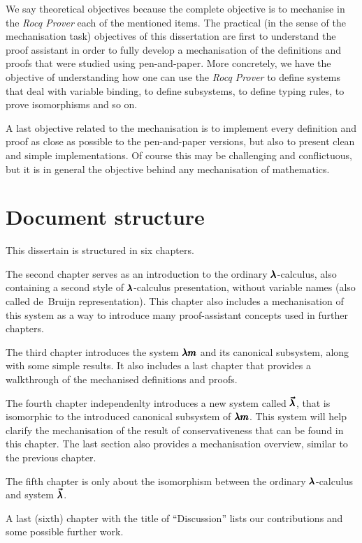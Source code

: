 We say theoretical objectives because the complete objective is to mechanise in the \textit{Rocq Prover} each of the mentioned items.
The practical (in the sense of the mechanisation task) objectives of this dissertation are first to understand the proof assistant in order to fully develop a mechanisation of the definitions and proofs that were studied using pen-and-paper.
More concretely, we have the objective of understanding how one can use the \textit{Rocq Prover} to define systems that deal with variable binding, to define subsystems, to define typing rules, to prove isomorphisms and so on.

A last objective related to the mechanisation is to implement every definition and proof as close as possible to the pen-and-paper versions, but also to present clean and simple implementations.
Of course this may be challenging and conflictuous, but it is in general the objective behind any mechanisation of mathematics. 

\section{Document structure}

This dissertain is structured in six chapters.

The second chapter serves as an introduction to the ordinary $\pmb{\lambda}$-calculus, also containing a second style of $\pmb{\lambda}$-calculus presentation, without variable names (also called de~Bruijn representation).
This chapter also includes a mechanisation of this system as a way to introduce many proof-assistant concepts used in further chapters.

The third chapter introduces the system $\pmb{\lambda m}$ and its canonical subsystem, along with some simple results.
It also includes a last chapter that provides a walkthrough of the mechanised definitions and proofs.

The fourth chapter independenlty introduces a new system called $\pmb{\vec \lambda}$, that is isomorphic to the introduced canonical subsystem of $\pmb{\lambda m}$.
This system will help clarify the mechanisation of the result of conservativeness that can be found in this chapter.
The last section also provides a mechanisation overview, similar to the previous chapter.

The fifth chapter is only about the isomorphism between the ordinary $\pmb{\lambda}$-calculus and system $\pmb{\vec \lambda}$.

A last (sixth) chapter with the title of ``Discussion'' lists our contributions and some possible further work.

